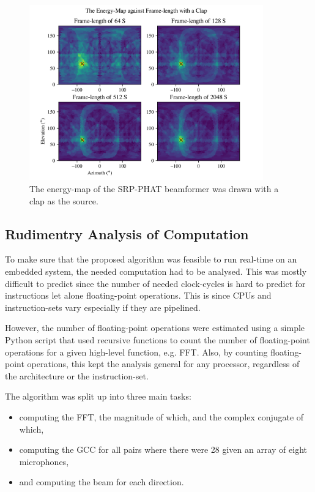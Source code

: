 \documentclass[notitlepage]{report}
\begin{document}
\begin{figure}[H]
\includegraphics[width=0.9\textwidth]{../Python/main_method/length/clap/map.png}
\centering
\caption{The energy-map of the SRP-PHAT beamformer was drawn with a clap as the source.}
\label{fig:mm_length_map_clap}
\centering
\end{figure}

\subsection{Rudimentry Analysis of Computation}

To make sure that the proposed algorithm was feasible to run real-time on an embedded system, the needed computation had to be analysed. This was mostly difficult to predict since the number of needed clock-cycles is hard to predict for instructions let alone floating-point operations. This is since CPUs and instruction-sets vary especially if they are pipelined.

However, the number of floating-point operations were estimated using a simple Python script that used recursive functions to count the number of floating-point operations for a given high-level function, e.g. FFT. Also, by counting floating-point operations, this kept the analysis general for any processor, regardless of the architecture or the instruction-set.

The algorithm was split up into three main tasks:
\begin{itemize}
	\item computing the FFT, the magnitude of which, and the complex conjugate of which,
	\item computing the GCC for all pairs where there were 28 given an array of eight microphones,
	\item and computing the beam for each direction.
\end{itemize}
\end{document}
